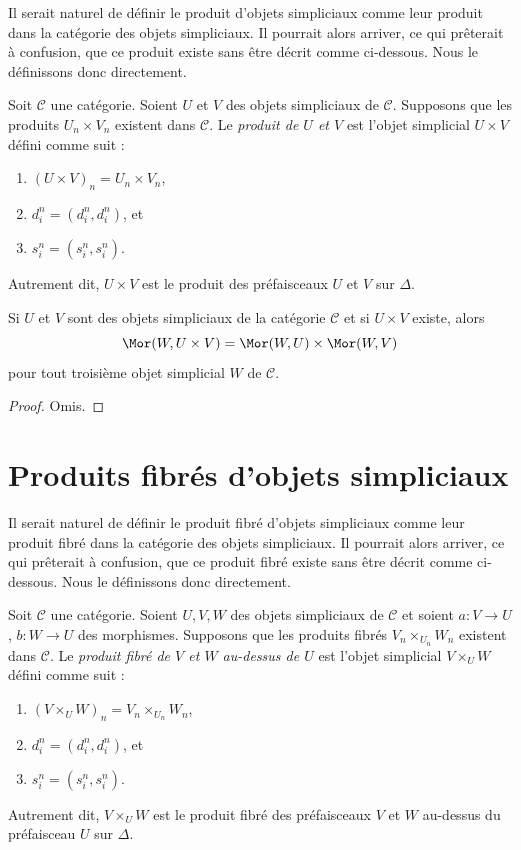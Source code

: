\noindent
Il serait naturel de définir le produit d'objets simpliciaux comme leur
produit dans la catégorie des objets simpliciaux. Il pourrait alors arriver,
ce qui prêterait à confusion, que ce produit existe sans être décrit comme
ci-dessous. Nous le définissons donc directement.

\begin{definition}
\label{definition-product}
Soit $\mathcal{C}$ une catégorie. Soient $U$ et $V$ des objets simpliciaux
de $\mathcal{C}$. Supposons que les produits $U_n \times V_n$ existent
dans $\mathcal{C}$. Le {\it produit de $U$ et $V$} est l'objet simplicial
$U \times V$ défini comme suit :
\begin{enumerate}
\item $(U \times V)_n = U_n \times V_n$,
\item $d^n_i = (d^n_i, d^n_i)$, et
\item $s^n_i = (s^n_i, s^n_i)$.
\end{enumerate}
Autrement dit, $U \times V$ est le produit des préfaisceaux $U$ et $V$
sur $\Delta$.
\end{definition}

\begin{lemma}
\label{lemma-product}
Si $U$ et $V$ sont des objets simpliciaux de la catégorie $\mathcal{C}$
et si $U \times V$ existe, alors
$$
\Mor(W, U \times V) =
\Mor(W, U) \times
\Mor(W, V)
$$
pour tout troisième objet simplicial $W$ de $\mathcal{C}$.
\end{lemma}

\begin{proof}
Omis.
\end{proof}


\section{Produits fibrés d'objets simpliciaux}
\label{section-fibre-products}

\noindent
Il serait naturel de définir le produit fibré d'objets simpliciaux comme
leur produit fibré dans la catégorie des objets simpliciaux. Il pourrait
alors arriver, ce qui prêterait à confusion, que ce produit fibré existe
sans être décrit comme ci-dessous. Nous le définissons donc directement.

\begin{definition}
\label{definition-fibre-product}
Soit $\mathcal{C}$ une catégorie. Soient $U, V, W$ des objets simpliciaux
de $\mathcal{C}$ et soient $a : V \to U$, $b : W \to U$ des morphismes.
Supposons que les produits fibrés $V_n \times_{U_n} W_n$ existent dans
$\mathcal{C}$. Le {\it produit fibré de $V$ et $W$ au-dessus de $U$}
est l'objet simplicial $V \times_U W$ défini comme suit :
\begin{enumerate}
\item $(V \times_U W)_n = V_n \times_{U_n} W_n$,
\item $d^n_i = (d^n_i, d^n_i)$, et
\item $s^n_i = (s^n_i, s^n_i)$.
\end{enumerate}
Autrement dit, $V \times_U W$ est le produit fibré des préfaisceaux
$V$ et $W$ au-dessus du préfaisceau $U$ sur $\Delta$.
\end{definition}

